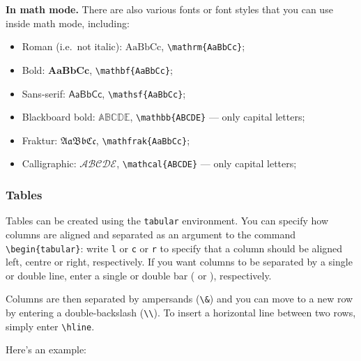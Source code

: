 \textbf{In math mode.} There are also various fonts or font styles that you can use inside math mode, including:
\begin{itemize}
\item Roman (i.e.\ not italic): $\mathrm{AaBbCc}$, \lstinline|\mathrm{AaBbCc}|;
\item Bold: $\mathbf{AaBbCc}$, \lstinline|\mathbf{AaBbCc}|;
\item Sans-serif: $\mathsf{AaBbCc}$, \lstinline|\mathsf{AaBbCc}|;
\item Blackboard bold: $\mathbb{ABCDE}$, \lstinline|\mathbb{ABCDE}| --- only capital letters;
\item Fraktur: $\mathfrak{AaBbCc}$, \lstinline|\mathfrak{AaBbCc}|;
\item Calligraphic: $\mathcal{ABCDE}$, \lstinline|\mathcal{ABCDE}| --- only capital letters;
\end{itemize}

\subsubsection*{Tables}
Tables can be created using the \lstinline|tabular| environment. You can specify how columns are aligned and separated as an argument to the command \lstinline|\begin{tabular}|: write \lstinline|l| or \lstinline|c| or \lstinline|r| to specify that a column should be aligned left, centre or right, respectively. If you want columns to be separated by a single or double line, enter a single or double bar (\texcode{|} or \texcode{||}), respectively.

Columns are then separated by ampersands (\lstinline|\&|) and you can move to a new row by entering a double-backslash (\lstinline|\\|). To insert a horizontal line between two rows, simply enter \lstinline|\hline|.

Here's an example:

